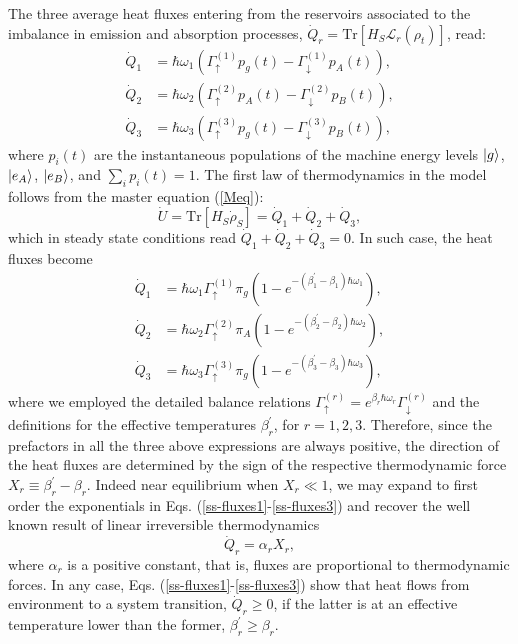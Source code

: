 \documentclass[aps,prx,twocolumn,showpacs,floatfix,superscriptaddress,graphics,longbibliography]{revtex4-1}
\newcommand{\tr}{\mathrm{Tr}}
\begin{document}
The three average heat fluxes entering from the reservoirs associated to the imbalance in emission and absorption processes, $\dot{Q}_r = \tr[H_S \mathcal{L}_r(\rho_t)]$, read:
\begin{eqnarray}
 \dot{Q}_1 &=  \hbar \omega_1 \left( \Gamma_\uparrow^{(1)} p_g(t) - \Gamma_\downarrow^{(1)} p_{A}(t) \right),  \\
 \dot{Q}_2 &=  \hbar \omega_2 \left( \Gamma_\uparrow^{(2)} p_{A}(t) - \Gamma_\downarrow^{(2)} p_{B}(t) \right),  \\
 \dot{Q}_3 &=  \hbar \omega_3 \left( \Gamma_\uparrow^{(3)} p_{g}(t) - \Gamma_\downarrow^{(3)} p_{B}(t) \right), 
\end{eqnarray}
where $p_i(t)$  are the instantaneous populations of the machine 
energy levels $\ket{g}$, $\ket{e_A}$, $\ket{e_B}$, and $\sum_i p_i(t) = 1$. The first law of thermodynamics in the model follows from the master equation (\ref{Meq}):
\begin{equation}
 \dot{U} = \tr[H_S \dot{\rho}_S] = \dot{Q}_1 + \dot{Q}_2 + \dot{Q}_3, 
\end{equation}
which in steady state conditions read $\dot{Q}_1 + \dot{Q}_2 + \dot{Q}_3 = 0$. In such case, the heat fluxes become
\begin{eqnarray} \label{ss-fluxes1}
 \dot{Q}_1 &= \hbar \omega_1  \Gamma_\uparrow^{(1)} \pi_{g} \left( 1 - e^{-(\beta_1^\prime -\beta_1) \hbar \omega_1} \right), \\
 \dot{Q}_2 &= \hbar \omega_2  \Gamma_\uparrow^{(2)} \pi_{A} \left( 1 - e^{-(\beta_2^\prime -\beta_2) \hbar \omega_2} \right),  \\ \label{ss-fluxes3}
 \dot{Q}_3 &= \hbar \omega_3  \Gamma_\uparrow^{(3)} \pi_{g} \left( 1 - e^{-(\beta_3^\prime -\beta_3) \hbar \omega_3} \right),
 \end{eqnarray}
where we employed the detailed balance relations $ \Gamma_\uparrow^{(r)} = e^{\beta_r \hbar \omega_r} \Gamma_\downarrow^{(r)}$ and the definitions for the effective temperatures $\beta_r^\prime$, 
for $r=1,2,3$. Therefore, since the prefactors in all the three above expressions are always positive, the direction of the heat fluxes are determined by the sign of the respective thermodynamic 
force $X_r \equiv \beta_r^\prime - \beta_r$. Indeed near equilibrium when $X_r \ll 1$, we may expand to first order the exponentials in Eqs. (\ref{ss-fluxes1}-\ref{ss-fluxes3}) and recover the well known result 
of linear irreversible thermodynamics
\begin{equation}
\dot{Q}_r = \alpha_r X_r,
\end{equation}
where $\alpha_r$ is a positive constant, that is, fluxes are proportional to thermodynamic forces. In any case, Eqs. (\ref{ss-fluxes1}-\ref{ss-fluxes3}) show that heat flows from environment to a system transition, 
$\dot{Q}_r \geq 0$, if the latter is at an effective temperature lower than the former, $\beta_r^\prime \geq \beta_r$.
\end{document}
